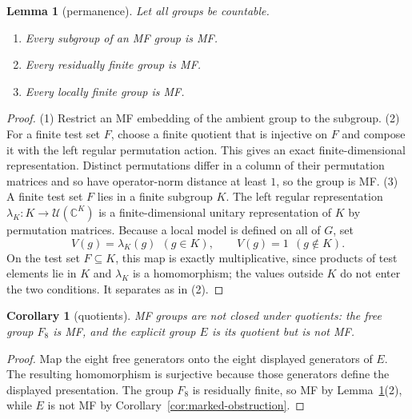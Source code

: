 \documentclass[11pt]{amsart}
\newcommand{\leanverified}[2]{\ignorespaces}
\newtheorem{lemma}[theorem]{Lemma}
\newtheorem{corollary}[theorem]{Corollary}
\theoremstyle{definition}
\theoremstyle{remark}
\theoremstyle{plain}
\newcommand{\C}{\mathbb C}
\newcommand{\U}{\mathcal U}
\begin{document}
\begin{lemma}[permanence]\label{lem:permanence}
Let all groups be countable.
\begin{enumerate}
\item Every subgroup of an MF group is MF\@.
\item Every residually finite group is MF\@.
\item Every locally finite group is MF\@.
\leanverified{Sofic/OperatorMFPositiveControls}{GroupApproximation.IsOperatorMF.subgroup}
\leanverified{Sofic/OperatorMFPositiveControls}{GroupApproximation.isOperatorMF_of_residuallyFinite}
\leanverified{Sofic/LocallyFiniteMF}{GroupApproximation.isOperatorMF_of_locallyFinite}
\end{enumerate}
\end{lemma}

\begin{proof}
(1)  Restrict an MF embedding of the ambient group to the subgroup.
(2)  For a finite test set $F$, choose a finite quotient that is injective on
$F$ and compose it with the left regular permutation action.  This gives an
exact finite-dimensional representation.  Distinct permutations differ in a
column of their permutation matrices and so have operator-norm distance
at least $1$, so the group is MF.
(3)  A finite test set $F$ lies in a finite subgroup $K$.  The left
regular representation $\lambda_K\colon K\to\U(\C^{K})$ is a
finite-dimensional unitary representation of $K$ by permutation
matrices.  Because a local model is defined on all of $G$, set
\[
 V(g)=\lambda_K(g)\ \ (g\in K),\qquad V(g)=1\ \ (g\notin K).
\]
On the test set $F\subseteq K$, this map is exactly multiplicative,
since products of test elements lie in $K$ and $\lambda_K$ is a
homomorphism; the values outside $K$ do not enter the two conditions.
It separates as in (2).
\end{proof}

\begin{corollary}[quotients]\label{cor:quotclosure}
MF groups are not closed under quotients: the free group
\(F_8\) is MF, and the explicit group \(E\) is its quotient
but is not MF\@.
\leanverified{Sofic/LiteralMFQuotientControls}{GroupApproximation.LiteralMFQuotientControls.manuscriptQuotientNonclosure}
\end{corollary}

\begin{proof}
Map the eight free generators onto the eight displayed generators of \(E\).
The resulting homomorphism is surjective because those generators define the
displayed presentation.  The group \(F_8\) is residually finite, so MF by
Lemma~\ref{lem:permanence}(2), while \(E\) is not MF by Corollary~\ref{cor:marked-obstruction}.
\end{proof}
\end{document}
